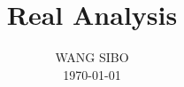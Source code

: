 

\setcounter{chapter}{-1}



\frontmatter

\makeatletter

\makeatother

\title{Real Analysis}
\author{WANG SIBO\\ \today}

\maketitle

\tableofcontents

\mainmatter












